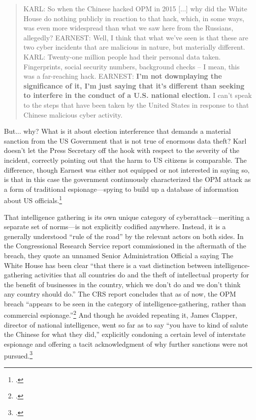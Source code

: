 \documentclass{report}
\begin{document}
\begin{refsegment}
\begin{quote}
KARL: So when the Chinese hacked OPM in 2015 [...] why did the White House do nothing publicly in reaction to that hack, which, in some ways, was even more widespread than what we saw here from the Russians, allegedly?
\newline \newline
EARNEST: Well, I think that what we've seen is that these are two cyber incidents that are malicious in nature, but materially different.
\newline \newline
KARL: Twenty-one million people had their personal data taken.  Fingerprints, social security numbers, background checks -- I mean, this was a far-reaching hack.
\newline \newline
EARNEST: \textbf{I'm not downplaying the significance of it, I'm just saying that it's different than seeking to interfere in the conduct of a U.S. national election.} I can't speak to the steps that have been taken by the United States in response to that Chinese malicious cyber activity.
\end{quote}

But... why? What is it about election interference that demands a material sanction from the US Government that is not true of enormous data theft? Karl doesn't let the Press Secretary off the hook with respect to the severity of the incident, correctly pointing out that the harm to US citizens is comparable. The difference, though Earnest was either not equipped or not interested in saying so, is that in this case the government continuously characterized the OPM attack as a form of traditional espionage---spying to build up a database of information about US officials.\footcite{nakashima_chinese_2015}

That intelligence gathering is its own unique category of cyberattack---meriting a separate set of norms---is not explicitly codified anywhere. Instead, it is a generally understood ``rule of the road'' by the relevant actors on both sides. In the Congressional Research Service report commissioned in the aftermath of the breach, they quote an unnamed Senior Administration Official a saying The White House has been clear ``that there is a vast distinction between intelligence-gathering activities that all countries do and the theft of intellectual property for the benefit of businesses in the country, which we don’t do and we don’t think any country should do.'' The CRS report concludes that as of now, the OPM breach ``appears to be seen in the category of intelligence-gathering, rather than commercial espionage.''\footcite{finklea_cyber_2015} And though he avoided repeating it, James Clapper, director of national intelligence, went so far as to say ``you have to kind of salute the Chinese for what they did,'' explicitly condoning a certain level of interstate espionage and offering a tacit acknowledgment of why further sanctions were not pursued.\footcite{sanger_u.s._2015}


\end{refsegment}
\end{document}
